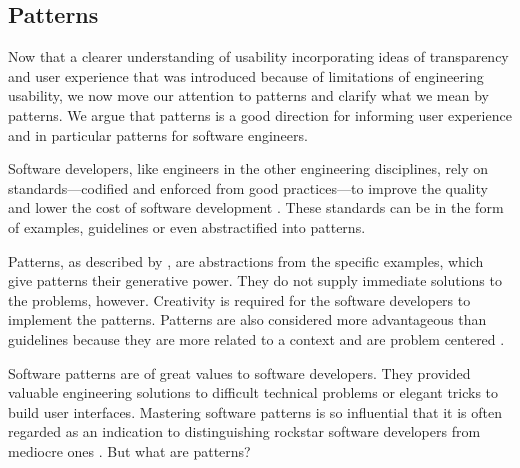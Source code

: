 \documentclass[a4paper,titlepage]{article}
\begin{document}
\subsection{Patterns}
\label{sec:patterns}
Now that a clearer understanding of usability incorporating ideas of
transparency and user experience that was introduced because of
limitations of engineering usability, we now move our attention to
patterns and clarify what we mean by patterns. We argue that patterns
is a good direction for informing user experience and in particular
patterns for software engineers.

Software developers, like engineers in the other engineering
disciplines, rely on standards---codified and enforced from good
practices---to improve the quality and lower the cost of software
development \citep{practice:ipenz}. These standards can be in the form
of examples, guidelines or even abstractified into patterns.

Patterns, as described by \citet{patterns:griffiths}, are abstractions
from the specific examples, which give patterns their generative
power. They do not supply immediate solutions to the problems,
however. Creativity is required for the software developers to
implement the patterns. Patterns are also considered more advantageous
than guidelines because they are more related to a context and are
problem centered \citep{patterns:welie}.

Software patterns are of great values to software developers. They
provided valuable engineering solutions to difficult technical
problems or elegant tricks to build user interfaces. Mastering
software patterns is so influential that it is often regarded as an
indication to distinguishing rockstar software developers from
mediocre ones \citep{rockstar:iskold}. But what are patterns?
\end{document}
